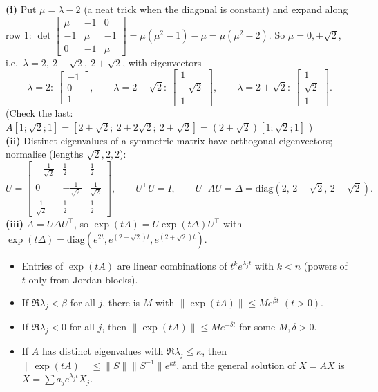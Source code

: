\begin{workbox}[title={Worked example (AE3, A3.3): real symmetric $A=\begin{bmatrix}2&1&0\\1&2&1\\0&1&2\end{bmatrix}$}]
\textbf{(i)} Put $\mu=\lambda-2$ (a neat trick when the diagonal is constant) and expand along row 1:
$\det\begin{bmatrix}\mu&-1&0\\-1&\mu&-1\\0&-1&\mu\end{bmatrix}=\mu(\mu^2-1)-\mu=\mu(\mu^2-2)$.
So $\mu=0,\pm\sqrt2$, i.e.\ $\lambda=2,\ 2-\sqrt2,\ 2+\sqrt2$, with eigenvectors
\[\lambda=2:\ \begin{bmatrix}-1\\0\\1\end{bmatrix},\qquad \lambda=2-\sqrt2:\ \begin{bmatrix}1\\-\sqrt2\\1\end{bmatrix},\qquad \lambda=2+\sqrt2:\ \begin{bmatrix}1\\\sqrt2\\1\end{bmatrix}.\]
(Check the last: $A[1;\sqrt2;1]=[2+\sqrt2;\ 2+2\sqrt2;\ 2+\sqrt2]=(2+\sqrt2)[1;\sqrt2;1]$ \checkmark)\\
\textbf{(ii)} Distinct eigenvalues of a symmetric matrix have orthogonal eigenvectors; normalise (lengths $\sqrt2,2,2$):
\[U=\begin{bmatrix}-\frac1{\sqrt2}&\frac12&\frac12\\0&-\frac{1}{\sqrt2}&\frac1{\sqrt2}\\\frac1{\sqrt2}&\frac12&\frac12\end{bmatrix},\qquad U^\top U=I,\qquad U^\top AU=\Delta=\mathrm{diag}(2,\,2-\sqrt2,\,2+\sqrt2).\]
\textbf{(iii)} $A=U\Delta U^\top$, so $\exp(tA)=U\exp(t\Delta)U^\top$ with $\exp(t\Delta)=\mathrm{diag}(e^{2t},e^{(2-\sqrt2)t},e^{(2+\sqrt2)t})$.
\end{workbox}

\begin{thmbox}[title={Growth bounds (Prop 0.16, Lemma 0.33, Lemma 0.41)}]
\begin{itemize}
\item Entries of $\exp(tA)$ are linear combinations of $t^ke^{\lambda_jt}$ with $k<n$ (powers of $t$ only from Jordan blocks).
\item If $\Re\lambda_j<\beta$ for all $j$, there is $M$ with $\|\exp(tA)\|\le Me^{\beta t}$ $(t>0)$.
\item If $\Re\lambda_j<0$ for all $j$, then $\|\exp(tA)\|\le Me^{-\delta t}$ for some $M,\delta>0$.
\item If $A$ has distinct eigenvalues with $\Re\lambda_j\le\kappa$, then $\|\exp(tA)\|\le\|S\|\|S^{-1}\|e^{\kappa t}$, and the general solution of $\dot X=AX$ is $X=\sum a_je^{\lambda_jt}X_j$.
\end{itemize}
\end{thmbox}

